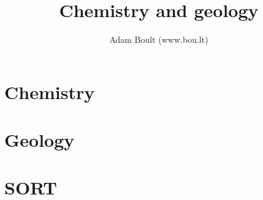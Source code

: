 \documentclass[oneside]{book}
\begin{document}
\author{Adam Boult (www.bou.lt)}
\title{Chemistry and geology}
\maketitle

\setcounter{tocdepth}{0}
\tableofcontents



\part{Chemistry}







\part{Geology}


\part{SORT}

\end{document}
